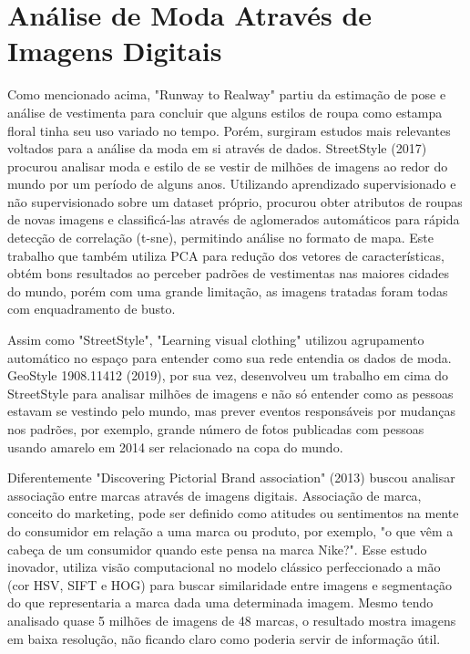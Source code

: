 \documentclass[12pt]{report}
\begin{document}
\section{Análise de Moda Através de Imagens Digitais}
 
 
Como mencionado acima, "Runway to Realway" partiu da estimação de pose e análise de vestimenta para concluir que alguns estilos de roupa como estampa floral tinha seu uso variado no tempo. Porém, surgiram estudos mais relevantes voltados para a análise da moda em si através de dados. StreetStyle (2017) procurou analisar moda e estilo de se vestir de milhões de imagens ao redor do mundo por um período de alguns anos. Utilizando aprendizado supervisionado e não supervisionado sobre um dataset próprio, procurou obter atributos de roupas de novas imagens e classificá-las através de aglomerados automáticos para rápida detecção de correlação (t-sne), permitindo análise no formato de mapa. Este trabalho que também utiliza PCA para redução dos vetores de características, obtém bons resultados ao perceber padrões de vestimentas nas maiores cidades do mundo, porém com uma grande limitação, as imagens tratadas foram todas com enquadramento de busto. 




Assim como "StreetStyle", "Learning visual clothing" utilizou agrupamento automático no espaço para entender como sua rede entendia os dados de moda. GeoStyle 1908.11412 (2019), por sua vez, desenvolveu um trabalho em cima do StreetStyle para analisar milhões de imagens e não só entender como as pessoas estavam se vestindo pelo mundo, mas prever eventos responsáveis por mudanças nos padrões, por exemplo, grande número de fotos publicadas com pessoas usando amarelo em 2014 ser relacionado na copa do mundo. 

Diferentemente "Discovering Pictorial Brand association" (2013) buscou analisar associação entre marcas através de imagens digitais. Associação de marca, conceito do marketing, pode ser definido como atitudes ou sentimentos na mente do consumidor em relação a uma marca ou produto, por exemplo, "o que vêm a cabeça de um consumidor quando este pensa na marca Nike?". Esse estudo inovador, utiliza visão computacional no modelo clássico perfeccionado a mão (cor HSV, SIFT e HOG) para buscar similaridade entre imagens e segmentação do que representaria a marca dada uma determinada imagem. Mesmo tendo analisado quase 5 milhões de imagens de 48 marcas, o resultado mostra imagens em baixa resolução, não ficando claro como poderia servir de informação útil. 
\end{document}
